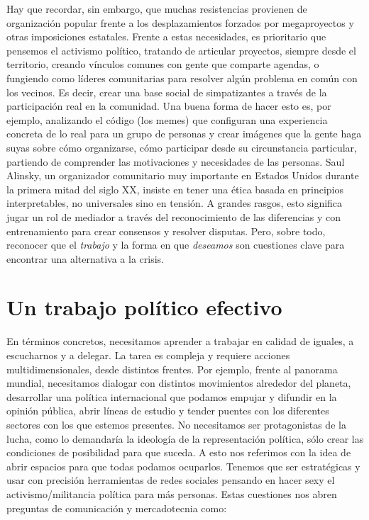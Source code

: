 Hay que recordar, sin embargo, que muchas resistencias provienen de organización popular frente a los desplazamientos forzados por megaproyectos y otras imposiciones estatales. Frente a estas necesidades, es prioritario que pensemos el activismo político, tratando de articular proyectos, siempre desde el territorio, creando vínculos comunes con gente que comparte agendas, o fungiendo como líderes comunitarias para resolver algún problema en común con los vecinos. Es decir, crear una base social de simpatizantes a través de la participación real en la comunidad. Una buena forma de hacer esto es, por ejemplo, analizando el código (los memes) que configuran una experiencia concreta de lo real para un grupo de personas y crear imágenes que la gente haga suyas sobre cómo organizarse, cómo participar desde su circunstancia particular, partiendo de comprender las motivaciones y necesidades de las personas. Saul Alinsky, un organizador comunitario muy importante en Estados Unidos durante la primera mitad del siglo XX, insiste en tener una ética basada en principios interpretables, no universales sino en tensión. A grandes rasgos, esto significa jugar un rol de mediador a través del reconocimiento de las diferencias y con entrenamiento para crear consensos y resolver disputas. Pero, sobre todo, reconocer que el \emph{trabajo} y la forma en que \emph{deseamos} son cuestiones clave para encontrar una alternativa a la crisis.

\section{Un trabajo político efectivo}
\label{sec:org0d34f13}

En términos concretos, necesitamos aprender a trabajar en calidad de iguales, a escucharnos y a delegar. La tarea es compleja y requiere acciones multidimensionales, desde distintos frentes. Por ejemplo, frente al panorama mundial, necesitamos dialogar con distintos movimientos alrededor del planeta, desarrollar una política internacional que podamos empujar y difundir en la opinión pública, abrir líneas de estudio y tender puentes con los diferentes sectores con los que estemos presentes. No necesitamos ser protagonistas de la lucha, como lo demandaría la ideología de la representación política, sólo crear las condiciones de posibilidad para que suceda. A esto nos referimos con la idea de abrir espacios para que todas podamos ocuparlos. Tenemos que ser estratégicas y usar con precisión herramientas de redes sociales pensando en hacer sexy el activismo/militancia política para más personas. Estas cuestiones nos abren preguntas de comunicación y mercadotecnia como:

